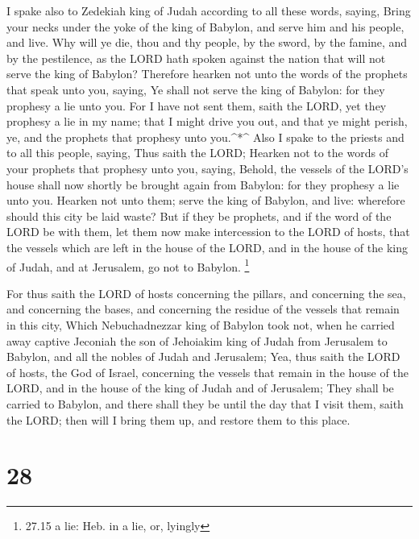  I spake also to Zedekiah king of Judah according to all
these words, saying, Bring your necks under the yoke of the king of
Babylon, and serve him and his people, and live.  Why will
ye die, thou and thy people, by the sword, by the famine, and by the
pestilence, as the LORD hath spoken against the nation that will not
serve the king of Babylon?  Therefore hearken not unto the
words of the prophets that speak unto you, saying, Ye shall not serve
the king of Babylon: for they prophesy a lie unto you.  For
I have not sent them, saith the LORD, yet they prophesy a lie in my
name; that I might drive you out, and that ye might perish, ye, and the
prophets that prophesy unto you.\^{}*\^{}  Also I spake to
the priests and to all this people, saying, Thus saith the LORD; Hearken
not to the words of your prophets that prophesy unto you, saying,
Behold, the vessels of the LORD's house shall now shortly be brought
again from Babylon: for they prophesy a lie unto you. 
Hearken not unto them; serve the king of Babylon, and live: wherefore
should this city be laid waste?  But if they be prophets,
and if the word of the LORD be with them, let them now make intercession
to the LORD of hosts, that the vessels which are left in the house of
the LORD, and in the house of the king of Judah, and at Jerusalem, go
not to Babylon. \footnote{27.15 a lie: Heb. in a lie, or, lyingly}

 For thus saith the LORD of hosts concerning the pillars,
and concerning the sea, and concerning the bases, and concerning the
residue of the vessels that remain in this city,  Which
Nebuchadnezzar king of Babylon took not, when he carried away captive
Jeconiah the son of Jehoiakim king of Judah from Jerusalem to Babylon,
and all the nobles of Judah and Jerusalem;  Yea, thus saith
the LORD of hosts, the God of Israel, concerning the vessels that remain
in the house of the LORD, and in the house of the king of Judah and of
Jerusalem;  They shall be carried to Babylon, and there
shall they be until the day that I visit them, saith the LORD; then will
I bring them up, and restore them to this place.

\hypertarget{section-27}{%
\section{28}\label{section-27}}

